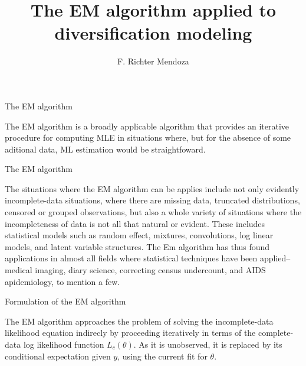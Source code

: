 \documentclass[11pt]{beamer}
\author{F. Richter Mendoza}
\title{The EM algorithm applied to diversification modeling}
\begin{document}
\begin{frame}
\titlepage
\end{frame}


\begin{frame}{The EM algorithm}

The EM algorithm is a broadly applicable algorithm that provides an iterative procedure for computing MLE in situations where, but for the absence of some aditional data, ML estimation would be straightfoward. 
\end{frame}

\begin{frame}{The EM algorithm}

The situations where the EM algorithm can be applies include not only evidently incomplete-data situations, where there are missing data, truncated distributions, censored or grouped observations, but also a whole variety of situations where the incompleteness of data is not all that natural or evident. These includes statistical models such as random effect, mixtures, convolutions, log linear models, and latent variable structures. The Em algorithm has thus found applications in almost all fields where statistical techniques have been applied-- medical imaging, diary science, correcting census undercount, and AIDS apidemiology, to mention a few. 

\end{frame}


\begin{frame}{Formulation of the EM algorithm}

The EM algorithm approaches the problem of solving the incomplete-data likelihood equation indirecly by proceeding iteratively in terms of the complete-data log likelihood function $L_c(\theta)$. As it is unobserved, it is replaced by its conditional expectation given $y$, using the current fit for $\theta$.  

\end{frame}
\end{document}
